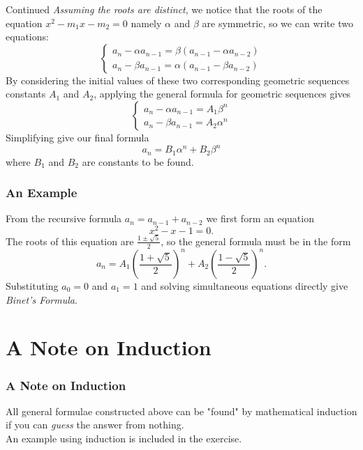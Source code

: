 \documentclass{beamer}
\theoremstyle{definition}
\theoremstyle{remark}
\begin{document}
\begin{frame}
  \begin{block}{Continued}
    \emph{Assuming the roots are distinct}, we notice that 
    the roots of the equation $x^2 - m_1 x -m_2 = 0$ namely $\alpha$ 
    and $\beta$ are symmetric, so we can write two equations:
    \[
      \begin{cases}
        a_n - \alpha a_{n-1} = \beta (a_{n-1} - \alpha a_{n-2}) \\
        a_n - \beta a_{n-1} = \alpha (a_{n-1} - \beta a_{n-2})
      \end{cases}
    \]
    By considering the initial values of these two 
    corresponding geometric sequences constants $A_1$ and $A_2$, applying
    the general formula for geometric sequences gives \[
      \begin{cases}
        a_n - \alpha a_{n-1} = A_1 \beta^n \\
        a_n - \beta a_{n-1} = A_2 \alpha^n 
      \end{cases}
    \]
    Simplifying give our final formula \[
      a_n = B_1 \alpha^n + B_2 \beta^n
    \]
    where $B_1$ and $B_2$ are constants to be found.
  \end{block}
\end{frame}
\begin{frame}
  \frametitle{An Example}
  \begin{examples}[Fibonacci]
    From the recursive formula $a_n = a_{n-1} + a_{n-2}$ we first 
    form an equation \[
      x^2 - x - 1 = 0.
    \]
    The roots of this equation are $\frac{1 \pm \sqrt{5}}{2}$, 
    so the general formula must be in the form \[
      a_n = A_1 \left(\frac{1+\sqrt{5}}{2}\right)^n
      + A_2 \left(\frac{1-\sqrt{5}}{2}\right)^n.
    \]
    Substituting $a_0 = 0$ and $a_1 = 1$ and solving 
    simultaneous equations directly give 
    \emph{Binet's Formula}.
   \end{examples}
\end{frame}
\section{A Note on Induction}
\begin{frame}
  \frametitle{A Note on Induction}
   All general formulae constructed above can be "found" 
   by mathematical induction if you can \emph{guess} the 
   answer from nothing. \\
   An example using induction is included in the 
   exercise. 
\end{frame}
\end{document}
